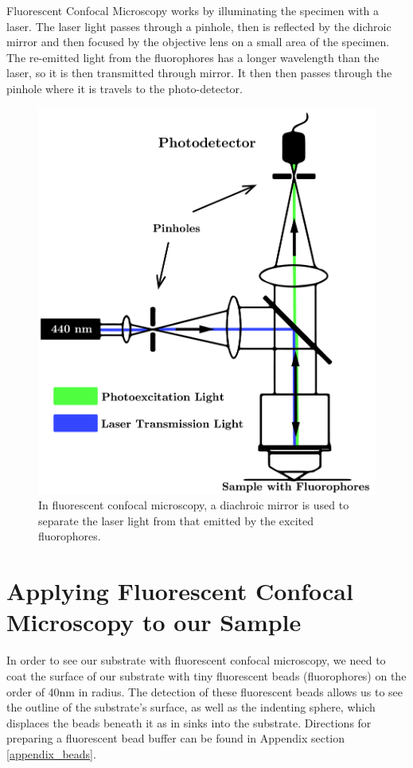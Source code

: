 Fluorescent Confocal Microscopy works by illuminating the specimen with a laser. The laser light passes through a pinhole, then is reflected by the dichroic mirror and then focused by the objective lens on a small area of the specimen. The re-emitted light from the fluorophores has a longer wavelength than the laser, so it is then transmitted through mirror.  It then then passes through the pinhole where it is travels to the photo-detector.
\begin{figure}
	\centering
	\includegraphics[width=0.7\linewidth]{Chapters/Figures/confocal_fluorescent_diagram}
	\caption[Fluorescent Confocal Microscopy]{In fluorescent confocal microscopy, a diachroic mirror is used to separate the laser light from that emitted by the excited fluorophores. }
	\label{fig:confocalfluorescentdiagram}
\end{figure}

\section{Applying Fluorescent Confocal Microscopy to our Sample}
In order to see our substrate with fluorescent confocal microscopy, we need to coat the surface of our substrate with tiny fluorescent beads (fluorophores) on the order of 40nm in radius. The detection of these fluorescent beads allows us to see the outline of the substrate's surface, as well as the indenting sphere, which displaces the beads beneath it as in sinks into the substrate. Directions for preparing a fluorescent bead buffer can be found in Appendix section \ref{appendix_beads}. 

